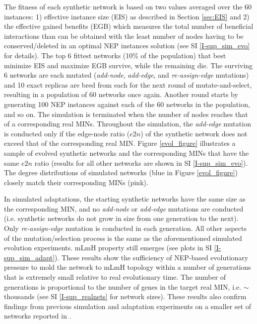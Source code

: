 \documentclass[12pt]{article}
\begin{document}
The fitness of each synthetic network is based on two values averaged over the 60 instances: 1) effective instance size (EIS) as described in Section \ref{sec:EIS}  and 2) the effective gained benefits (EGB) which measures the total number of beneficial interactions than can be obtained with the least number of nodes having to be conserved/deleted in an optimal NEP instances solution (see SI \ref{I-sup_sim_evo} for details). The top 6  fittest  networks (10\% of the population) that best minimize EIS and maximize EGB survive, while the remaining die. The surviving 6 networks are each mutated (\textit{add-node}, \textit{add-edge}, and \textit{re-assign-edge} mutations) and 10 exact replicas are bred from each for the next round of mutate-and-select, resulting in a population of 60 networks once again. Another round starts by generating 100 NEP instances against each of the 60 networks in the population, and so on. The simulation is terminated when the number of nodes reaches that of a corresponding real MINs. Throughout the simulation, the \textit{add-edge} mutation is conducted only if the edge-node ratio ($e2n$) of the synthetic network does not exceed that of the corresponding real MIN. Figure \ref{evol_figure} illustrates a sample of evolved synthetic networks and the corresponding MINs that have the same $e2n$ ratio (results for all other networks are shown in SI \ref{I-sup_sim_evo}). The degree distributions of simulated networks (blue in Figure \ref{evol_figure}) closely match their corresponding MINs (pink).

In simulated adaptations, the starting synthetic networks have the same size as the corresponding MIN, and no \textit{add-node} or \textit{add-edge} mutations are conducted (i.e. synthetic networks do not grow in size from one generation to the next). Only \textit{re-assign-edge} mutation is conducted in each generation. All other aspects of the mutation/selection process is the same as the aforementioned simulated evolution experiments. mLmH property still emerges (see plots in SI \ref{I-sup_sim_adapt}). These results show the sufficiency of NEP-based evolutionary pressure to mold the network to mLmH topology within a number of generations that is extremely small relative to real evolutionary time. The number of generations is proportional to the number of genes in the target real MIN, i.e. ${\sim}$thousands (see SI \ref{I-sup_realnets} for network sizes). These results also confirm findings from previous simulation and adaptation experiments on a smaller set of networks reported in \cite{atiia_computational_2017-1}.
\end{document}

